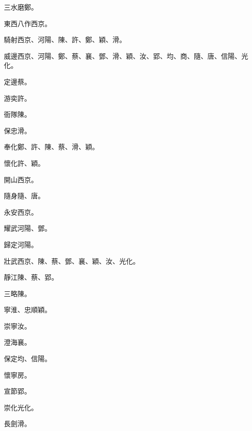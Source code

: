 \begin{pinyinscope}
 三水磨鄭。



 東西八作西京。



 騎射西京、河陽、陳、許、鄭、穎、滑。



 威邊西京、河陽、鄭、蔡、襄、鄧、滑、穎、汝、郢、均、商、隨、唐、信陽、光化。



 定邊蔡。



 游奕許。



 衙隊陳。



 保忠滑。



 奉化鄭、許、陳、蔡、滑、穎。



 懷化許、穎。



 開山西京。



 隨身隨、唐。



 永安西京。



 耀武河陽、鄧。



 歸定河陽。



 壯武西京、陳、蔡、鄧、襄、穎、汝、光化。



 靜江陳、蔡、郢。



 三略陳。



 寧淮、忠順穎。



 崇寧汝。



 澄海襄。



 保定均、信陽。



 懷寧房。



 宣節郢。



 崇化光化。



 長劍滑。




\end{pinyinscope}
